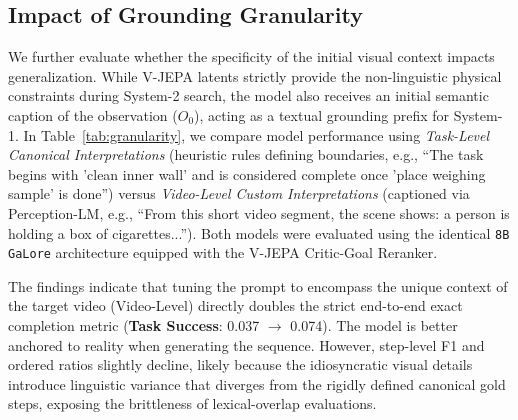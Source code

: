 \documentclass{article}
\begin{document}
\subsection{Impact of Grounding Granularity}
We further evaluate whether the specificity of the initial visual context impacts generalization. While V-JEPA latents strictly provide the non-linguistic physical constraints during System-2 search, the model also receives an initial semantic caption of the observation ($O_0$), acting as a textual grounding prefix for System-1. In Table~\ref{tab:granularity}, we compare model performance using \textit{Task-Level Canonical Interpretations} (heuristic rules defining boundaries, e.g., ``The task begins with 'clean inner wall' and is considered complete once 'place weighing sample' is done'') versus \textit{Video-Level Custom Interpretations} (captioned via Perception-LM, e.g., ``From this short video segment, the scene shows: a person is holding a box of cigarettes...''). Both models were evaluated using the identical \texttt{8B GaLore} architecture equipped with the V-JEPA Critic-Goal Reranker.

\begin{table}[h]
\centering
\caption{Comparison of Zero-Shot Performance depending on the granularity of the visual interpreter prefix. Video-level descriptions double the task success rate by providing instance-specific cues, although they slightly reduce explicit step-level F1 tracking due to lexical variance.}
\label{tab:granularity}
\end{table}





The findings indicate that tuning the prompt to encompass the unique context of the target video (Video-Level) directly doubles the strict end-to-end exact completion metric (\textbf{Task Success}: 0.037 $\rightarrow$ 0.074). The model is better anchored to reality when generating the sequence. However, step-level F1 and ordered ratios slightly decline, likely because the idiosyncratic visual details introduce linguistic variance that diverges from the rigidly defined canonical gold steps, exposing the brittleness of lexical-overlap evaluations.
\end{document}
